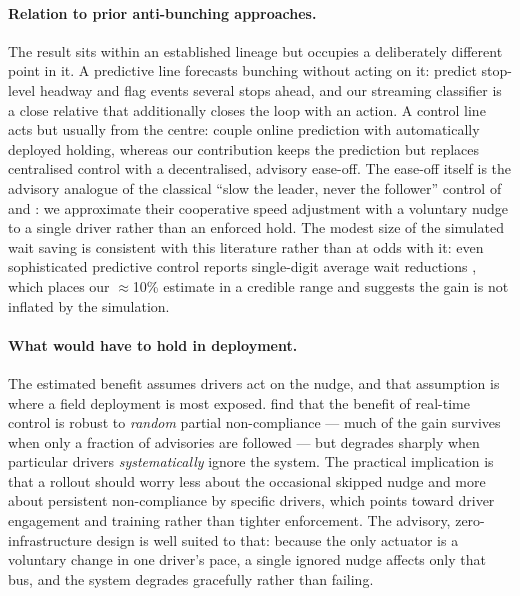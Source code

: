 \documentclass[11pt,a4paper]{article}
\begin{document}
\paragraph{Relation to prior anti-bunching approaches.}
The result sits within an established lineage but occupies a deliberately different point in it.
A predictive line forecasts bunching without acting on it: \citet{Yu2016} predict stop-level
headway and flag events several stops ahead, and our streaming classifier is a close relative that
additionally closes the loop with an action. A control line acts but usually from the centre:
\citet{MoreiraMatias2016} couple online prediction with automatically deployed holding, whereas our
contribution keeps the prediction but replaces centralised control with a decentralised, advisory
ease-off. The ease-off itself is the advisory analogue of the classical ``slow the leader, never the
follower'' control of \citet{Daganzo2009} and \citet{DaganzoPilachowski2011}: we approximate their
cooperative speed adjustment with a voluntary nudge to a single driver rather than an enforced
hold. The modest size of the simulated wait saving is consistent with this literature rather than at
odds with it: even sophisticated predictive control reports single-digit average wait reductions
\citep{MoreiraMatias2016}, which places our $\approx$10\% estimate in a credible range and suggests
the gain is not inflated by the simulation.

\paragraph{What would have to hold in deployment.}
The estimated benefit assumes drivers act on the nudge, and that assumption is where a field
deployment is most exposed. \citet{Phillips2015} find that the benefit of real-time control is
robust to \emph{random} partial non-compliance --- much of the gain survives when only a fraction of
advisories are followed --- but degrades sharply when particular drivers \emph{systematically} ignore
the system. The practical implication is that a rollout should worry less about the occasional
skipped nudge and more about persistent non-compliance by specific drivers, which points toward
driver engagement and training rather than tighter enforcement. The advisory, zero-infrastructure
design is well suited to that: because the only actuator is a voluntary change in one driver's pace,
a single ignored nudge affects only that bus, and the system degrades gracefully rather than failing.
\end{document}
